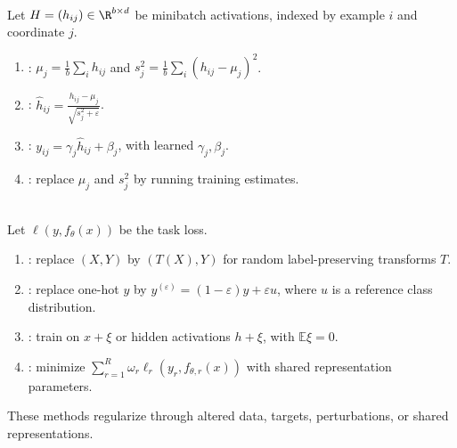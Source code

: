 \begin{definition} \label{def:sl-batch-normalization} \\
Let $H=(h_{ij})\in\R^{b\times d}$ be minibatch activations, indexed by example $i$ and coordinate $j$.
\begin{enumerate}[label=(\roman*)]
\setlength{\itemsep}{0pt}
\item {}: $\mu_j=\frac{1}{b}\sum\limits_i h_{ij}$ and $s_j^2=\frac{1}{b}\sum\limits_i(h_{ij}-\mu_j)^2$.
\item {}: $\widehat h_{ij}=\frac{h_{ij}-\mu_j}{\sqrt{s_j^2+\varepsilon}}$.
\item {}: $y_{ij}=\gamma_j\widehat h_{ij}+\beta_j$, with learned $\gamma_j,\beta_j$.
\item {}: replace $\mu_j$ and $s_j^2$ by running training estimates.
\end{enumerate}
\end{definition}

\begin{remark} \label{rem:sl-data-augmentation-noise} \\
Let $\ell(y,f_\theta(x))$ be the task loss.
\begin{enumerate}[label=(\roman*)]
\setlength{\itemsep}{0pt}
\item {}: replace $(X,Y)$ by $(T(X),Y)$ for random label-preserving transforms $T$.
\item {}: replace one-hot $y$ by $y^{(\varepsilon)}=(1-\varepsilon)y+\varepsilon u$, where $u$ is a reference class distribution.
\item {}: train on $x+\xi$ or hidden activations $h+\xi$, with $\mathbb E\xi=0$.
\item {}: minimize $\sum\limits_{r=1}^R\omega_r\ell_r(y_r,f_{\theta,r}(x))$ with shared representation parameters.
\end{enumerate}
These methods regularize through altered data, targets, perturbations, or shared representations.
\end{remark}
